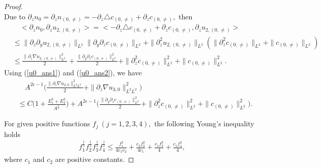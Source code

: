 \documentclass[12pt, reqno]{amsart}
\numberwithin{equation}{section}
\begin{document}
\begin{proof}
\begin{equation}
		\end{equation}
		Due to $\partial_zn_{0}=\partial_zn_{(0,\neq)}=-\partial_z\triangle c_{(0,\neq)}+\partial_zc_{(0,\neq)},$ then 
		\begin{equation}\label{u0_ans2}
			\begin{aligned}
				&\quad<\partial_zn_{0}, \partial_zu_{2,(0,\neq)}>
				=<-\partial_z\triangle c_{(0,\neq)}+\partial_zc_{(0,\neq)}, 	\partial_zu_{2,(0,\neq)}>\\
				&\leq \|\partial_z\partial_y u_{2,(0,\neq)}\|_{L^2}
				\|\partial_y\partial_z c_{(0,\neq)}\|_{L^2}
				+\|\partial_z^2u_{2,(0,\neq)}\|_{L^2}
				(\|\partial_z^2c_{(0,\neq)}\|_{L^2}
				+\|c_{(0,\neq)}\|_{L^2})
				\\
				&\leq \frac{\|\partial_z \nabla u_{2,(0,\neq)}\|_{L^2}^2
				}{2}+\frac{\|\partial_y\partial_z c_{(0,\neq)}\|_{L^2}^2}{2}
				+\|\partial_z^2 c_{(0,\neq)}\|_{L^2}^2
				+\| c_{(0,\neq)}\|_{L^2}^2.
			\end{aligned}
		\end{equation}
		Using (\ref{u0_ans1}) and (\ref{u0_ans2}), we have 
		\begin{equation}\label{u0_ans3}
			\begin{aligned}
				&\quad 
				A^{2\epsilon-1}\Big(\frac{\|\partial_z\nabla u_{2,0}\|_{L^2L^2}^2}{2}
				+\|\partial_z\nabla u_{3,0}\|_{L^2L^2}^2\Big)\\
				&\leq C\Big(1+\frac{E_1^3+E_2^3}{A^{\frac{\epsilon}{2}}}\Big)
				+A^{2\epsilon-1}\Big(\frac{\|\partial_y\partial_z c_{(0,\neq)}\|_{L^2}^2}{2}
				+\|\partial_z^2 c_{(0,\neq)}\|_{L^2}^2
				+\| c_{(0,\neq)}\|_{L^2}^2\Big).
			\end{aligned}
		\end{equation}
		
		For given positive functions $f_j~(j=1,2,3,4),$  the following Young's inequality holds
		\begin{equation}\label{young_1}
			\begin{aligned}
				f_1^{\frac{1}{2}}f_2^{\frac{1}{2}}
				f_3^{\frac{1}{2}}f_4^{\frac{1}{2}}
				\leq \frac{f_1^2}{4c_1c_2}+\frac{c_2f_2^2}{4c_1}
				+\frac{c_1f_3^2}{4}+\frac{c_1f_4^2}{4}, 
			\end{aligned}
		\end{equation}
		where $c_1$ and $c_2$ are positive constants.
		

\end{proof}
\end{document}
